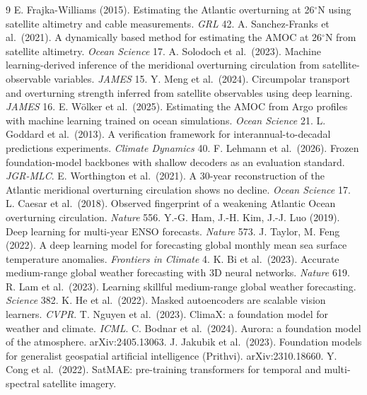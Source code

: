 \documentclass[10pt]{article}
\begin{document}
\begin{thebibliography}{9}\small
{} E. Frajka-Williams (2015). Estimating the Atlantic
overturning at 26$^\circ$N using satellite altimetry and cable
measurements. \emph{GRL} 42.
 A. Sanchez-Franks et al.\ (2021). A dynamically based
method for estimating the AMOC at 26$^\circ$N from satellite
altimetry. \emph{Ocean Science} 17.
 A. Solodoch et al.\ (2023). Machine
learning-derived inference of the meridional overturning circulation
from satellite-observable variables. \emph{JAMES} 15.
 Y. Meng et al.\ (2024). Circumpolar transport and
overturning strength inferred from satellite observables using deep
learning. \emph{JAMES} 16.
 E. W\"olker et al.\ (2025). Estimating the AMOC from
Argo profiles with machine learning trained on ocean simulations.
\emph{Ocean Science} 21.
 L. Goddard et al.\ (2013). A verification framework
for interannual-to-decadal predictions experiments. \emph{Climate
Dynamics} 40.
 F. Lehmann et al.\ (2026). Frozen foundation-model
backbones with shallow decoders as an evaluation standard.
\emph{JGR-MLC}.
 E. Worthington et al.\ (2021). A 30-year
reconstruction of the Atlantic meridional overturning circulation shows
no decline. \emph{Ocean Science} 17.
 L. Caesar et al.\ (2018). Observed fingerprint of a
weakening Atlantic Ocean overturning circulation. \emph{Nature} 556.
 Y.-G. Ham, J.-H. Kim, J.-J. Luo (2019). Deep learning
for multi-year ENSO forecasts. \emph{Nature} 573.
 J. Taylor, M. Feng (2022). A deep learning model
for forecasting global monthly mean sea surface temperature anomalies.
\emph{Frontiers in Climate} 4.
 K. Bi et al.\ (2023). Accurate medium-range global
weather forecasting with 3D neural networks. \emph{Nature} 619.
 R. Lam et al.\ (2023). Learning skillful
medium-range global weather forecasting. \emph{Science} 382.
 K. He et al.\ (2022). Masked autoencoders are scalable
vision learners. \emph{CVPR}.
 T. Nguyen et al.\ (2023). ClimaX: a foundation model
for weather and climate. \emph{ICML}.
 C. Bodnar et al.\ (2024). Aurora: a foundation model
of the atmosphere. arXiv:2405.13063.
 J. Jakubik et al.\ (2023). Foundation models for
generalist geospatial artificial intelligence (Prithvi).
arXiv:2310.18660.
 Y. Cong et al.\ (2022). SatMAE: pre-training
transformers for temporal and multi-spectral satellite imagery.

\end{thebibliography}
\end{document}
